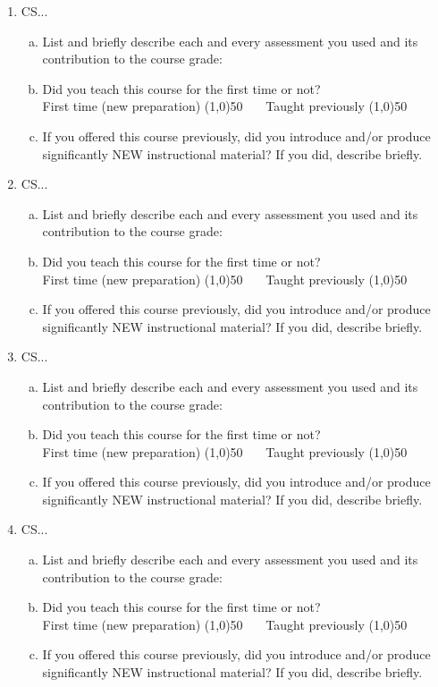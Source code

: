 \documentclass[12pt]{article}
\begin{document}
\begin{enumerate}
  \item CS...
    \begin{enumerate}[a)]
    \item  List and briefly describe each and every assessment you used and its contribution to the course grade:
    \item Did you teach this course for the first time or not? \\
      First time (new preparation) \line(1,0){50}  ~~~Taught previously \line(1,0){50}
    \item If you offered this course previously, did you introduce and/or produce significantly NEW instructional material? If you did, describe briefly. 
    \end{enumerate}
  \item CS...
    \begin{enumerate}[a)]
    \item  List and briefly describe each and every assessment you used and its contribution to the course grade:
    \item Did you teach this course for the first time or not? \\
      First time (new preparation) \line(1,0){50}  ~~~Taught previously \line(1,0){50}
    \item If you offered this course previously, did you introduce and/or produce significantly NEW instructional material? If you did, describe briefly. 
    \end{enumerate}
  \item CS...
    \begin{enumerate}[a)]
    \item  List and briefly describe each and every assessment you used and its contribution to the course grade:
    \item Did you teach this course for the first time or not? \\
      First time (new preparation) \line(1,0){50}  ~~~Taught previously \line(1,0){50}
    \item If you offered this course previously, did you introduce and/or produce significantly NEW instructional material? If you did, describe briefly. 
    \end{enumerate}
  \item CS...
    \begin{enumerate}[a)]
    \item  List and briefly describe each and every assessment you used and its contribution to the course grade:
    \item Did you teach this course for the first time or not? \\
      First time (new preparation) \line(1,0){50}  ~~~Taught previously \line(1,0){50}
    \item If you offered this course previously, did you introduce and/or produce significantly NEW instructional material? If you did, describe briefly. 
    \end{enumerate}
\end{enumerate}
\end{document}
